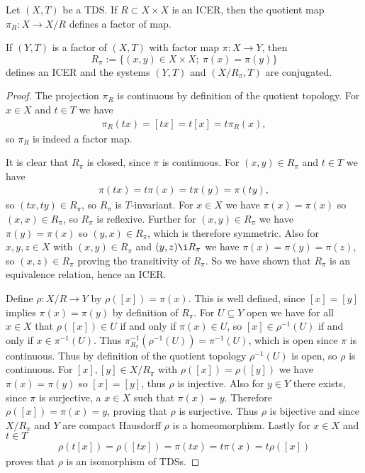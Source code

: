 \begin{proposition}
	Let $(X, T)$ be a TDS. If $R \subset X \times X$ is an ICER, then the quotient map $\pi_R: X \to X/R$ defines a factor of map.
	
	If $(Y, T)$ is a factor of $(X, T)$ with factor map $\pi: X \to Y$, then
	\begin{equation*}
		R_\pi := \{(x, y) \in X \times X;\ \pi(x) = \pi(y)\}
	\end{equation*}
	defines an ICER and the systems $(Y, T)$ and $(X/R_\pi, T)$ are conjugated.
\end{proposition}
\begin{proof}
	The projection $\pi_R$ is continuous by definition of the quotient topology. For $x \in X$ and $t \in T$ we have
	\begin{align*}
		\pi_R(tx) = [tx] = t[x] = t\pi_R(x),
	\end{align*}
	so $\pi_R$ is indeed a factor map.
	
	It is clear that $R_\pi$ is closed, since $\pi$ is continuous. For $(x, y) \in R_\pi$ and $t \in T$ we have
	\begin{align*}
		\pi(tx) = t\pi(x) = t\pi(y) = \pi(ty),
 	\end{align*}
 	so $(tx, ty) \in R_\pi$, so $R_\pi$ is $T$-invariant. For $x \in X$ we have $\pi(x) = \pi(x)$ so $(x, x) \in R_\pi$, so $R_\pi$ is reflexive. Further for $(x, y) \in R_\pi$ we have $\pi(y) = \pi(x)$ so $(y, x) \in R_\pi$, which is therefore symmetric. Also for $x, y, z \in X$ with $(x, y) \in R_\pi$ and $(y, z) \i R_\pi$ we have $\pi(x) = \pi(y) = \pi(z)$, so $(x, z) \in R_\pi$ proving the transitivity of $R_\pi$. So we have shown that $R_\pi$ is an equivalence relation, hence an ICER.
 	
 	Define $\rho: X/R \to Y$ by $\rho([x]) = \pi(x)$. This is well defined, since $[x] = [y]$ implies $\pi(x) = \pi(y)$ by definition of $R_\pi$. For $U \subseteq Y$ open we have for all $x \in X$ that $\rho([x]) \in U$ if and only if $\pi(x) \in U$, so $[x] \in \rho^{-1}(U)$ if and only if $x \in \pi^{-1}(U)$. Thus $\pi_{R_\pi}^{-1}(\rho^{-1}(U)) = \pi^{-1}(U)$, which is open since $\pi$ is continuous. Thus by definition of the quotient topology $\rho^{-1}(U)$ is open, so $\rho$ is continuous. For $[x], [y] \in X/R_\pi$ with $\rho([x]) = \rho([y])$ we have $\pi(x) = \pi(y)$ so $[x] = [y]$, thus $\rho$ is injective. Also for $y \in Y$ there exists, since $\pi$ is surjective, a $x \in X$ such that $\pi(x) = y$. Therefore $\rho([x]) = \pi(x) = y$, proving that $\rho$ is surjective. Thus $\rho$ is bijective and since $X/R_\pi$ and $Y$ are compact Hausdorff $\rho$ is a homeomorphism. Lastly for $x \in X$ and $t \in T$
 	\begin{align*}
 		\rho(t[x]) = \rho([tx]) = \pi(tx) = t\pi(x) = t\rho([x])
 	\end{align*}
 	proves that $\rho$ is an isomorphism of TDSs.
\end{proof}

